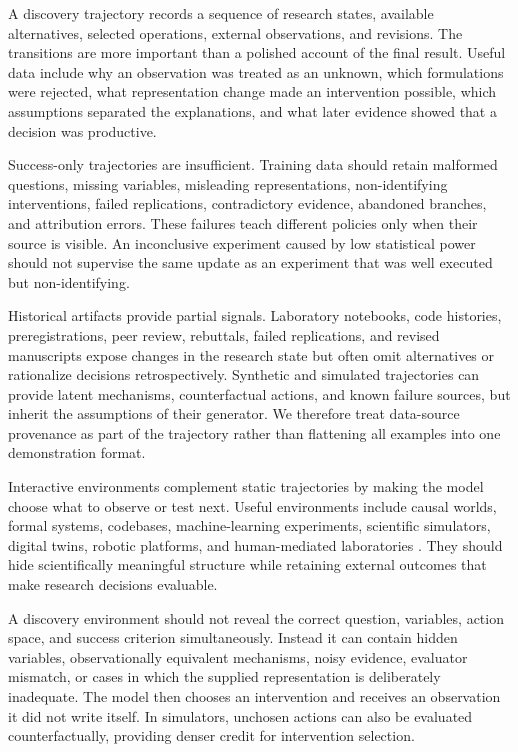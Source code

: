 \documentclass[11pt, a4paper, copyright]{google}
\begin{document}
A discovery trajectory records a sequence of research states, available alternatives, selected operations, external observations, and revisions. The transitions are more important than a polished account of the final result. Useful data include why an observation was treated as an unknown, which formulations were rejected, what representation change made an intervention possible, which assumptions separated the explanations, and what later evidence showed that a decision was productive.

Success-only trajectories are insufficient. Training data should retain malformed questions, missing variables, misleading representations, non-identifying interventions, failed replications, contradictory evidence, abandoned branches, and attribution errors. These failures teach different policies only when their source is visible. An inconclusive experiment caused by low statistical power should not supervise the same update as an experiment that was well executed but non-identifying.

Historical artifacts provide partial signals. Laboratory notebooks, code histories, preregistrations, peer review, rebuttals, failed replications, and revised manuscripts expose changes in the research state but often omit alternatives or rationalize decisions retrospectively. Synthetic and simulated trajectories can provide latent mechanisms, counterfactual actions, and known failure sources, but inherit the assumptions of their generator. We therefore treat data-source provenance as part of the trajectory rather than flattening all examples into one demonstration format.

Interactive environments complement static trajectories by making the model choose what to observe or test next. Useful environments include causal worlds, formal systems, codebases, machine-learning experiments, scientific simulators, digital twins, robotic platforms, and human-mediated laboratories \citep{gandhi2025boxinggym,majumder2025discoverybench,huang2024mlagentbench,hafner2025dreamer}. They should hide scientifically meaningful structure while retaining external outcomes that make research decisions evaluable.

A discovery environment should not reveal the correct question, variables, action space, and success criterion simultaneously. Instead it can contain hidden variables, observationally equivalent mechanisms, noisy evidence, evaluator mismatch, or cases in which the supplied representation is deliberately inadequate. The model then chooses an intervention and receives an observation it did not write itself. In simulators, unchosen actions can also be evaluated counterfactually, providing denser credit for intervention selection.
\end{document}
